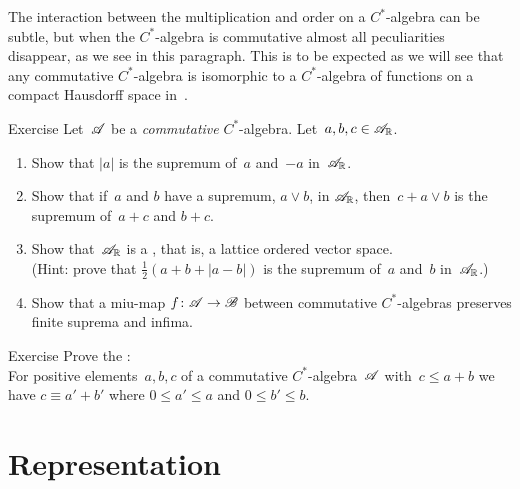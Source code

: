 \documentclass[a]{subfiles}
\begin{document}
\begin{parsec}%
\begin{point}%
The interaction between the multiplication and order
on a $C^*$-algebra can be subtle,
but
when the $C^*$-algebra is commutative
almost all peculiarities disappear,
as we see in this paragraph.
This is to be expected
as we will see that any commutative $C^*$-algebra
is isomorphic to a $C^*$-algebra
of functions on a compact Hausdorff space
in~.
\end{point}
\begin{point}{Exercise}%
Let~$\mathscr{A}$ be a \emph{commutative} $C^*$-algebra.
Let~$a,b,c\in\mathscr{A}_{\mathbb{R}}$.
\begin{enumerate}
\item
Show that $\left| a\right|$ is the supremum of~$a$ and~$-a$
in~$\mathscr{A}_{\mathbb{R}}$.
\item
Show that if~$a$ and $b$ have a supremum, $a\vee b$, in $\mathscr{A}_{\mathbb{R}}$,
then~$c+a\vee b$ is the supremum of~$a+c$ and $b+c$.
\item
Show that~$\mathscr{A}_{\mathbb{R}}$ is a ,
that is,  a lattice ordered vector space.\\
(Hint: prove that $\frac{1}{2}(a+b+\left|a-b\right|)$
is the supremum of~$a$ and~$b$ in~$\mathscr{A}_{\mathbb{R}}$.)
\item
Show that a miu-map $f\colon \mathscr{A}\to\mathscr{B}$
between commutative $C^*$-algebras
preserves finite suprema and infima.
\end{enumerate}
\end{point}
\begin{point}{Exercise}%
Prove the :\\
For positive elements~$a,b,c$ of a commutative $C^*$-algebra~$\mathscr{A}$
with~$c\leq a+b$
we have $c\equiv a'+b'$
where  $0\leq a'\leq a$ and $0\leq b'\leq b$.
\end{point}
\end{parsec}
\section{Representation}
\end{document}
